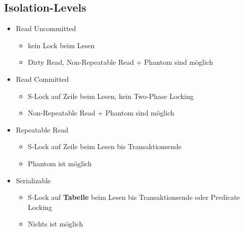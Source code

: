 \subsection{Isolation-Levels}
\begin{itemize}
    \item Read Uncommitted
    \begin{itemize}
        \item kein Lock beim Lesen
        \item Dirty Read, Non-Repeatable Read + Phantom sind möglich
    \end{itemize}
    \item Read Committed
    \begin{itemize}
        \item S-Lock auf Zeile beim Lesen, kein Two-Phase Locking
        \item Non-Repeatable Read + Phantom sind möglich
    \end{itemize}
    \item Repeatable Read
    \begin{itemize}
        \item S-Lock auf Zeile beim Lesen bis Transaktionsende
        \item Phantom ist möglich
    \end{itemize}
    \item Serializable
    \begin{itemize}
        \item S-Lock auf \textbf{Tabelle} beim Lesen bis Transaktionsende oder Predicate Locking
        \item Nichts ist möglich
    \end{itemize}
\end{itemize}